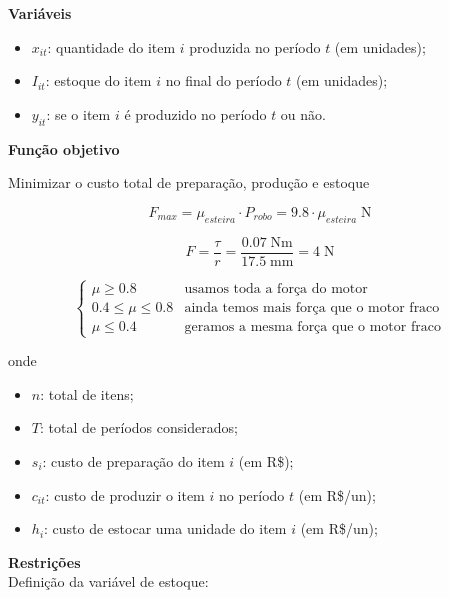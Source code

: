 \documentclass[12pt]{scrartcl}
\newcommand{\un}[1]{\;\textrm{#1}}
\begin{document}
\Large

\textbf{Variáveis}

\begin{itemize}
    \item $x_{it}$: quantidade do item $i$ produzida no período $t$ (em unidades);
    \item $I_{it}$: estoque do item $i$ no final do período $t$ (em unidades);
    \item $y_{it}$: se o item $i$ é produzido no período $t$ ou não.
  \end{itemize}

\textbf{Função objetivo}

Minimizar o custo total de preparação, produção e estoque

\LARGE

\[ F_{max} = \mu_{esteira} \cdot P_{robo} = 9.8 \cdot \mu_{esteira} \un{N}  \]

\[ F = \frac{\tau}{r} = \frac{0.07 \un{Nm}}{17.5 \un{mm}} = 4 \un{N} \]


\Large

\begin{equation}
    \begin{cases}
      \mu \geq 0.8 & \text{usamos toda a força do motor}\\
      0.4 \leq \mu \leq 0.8 & \text{ainda temos mais força que o motor fraco}\\
      \mu \leq 0.4 & \text{geramos a mesma força que o motor fraco}
    \end{cases}       
\end{equation}



onde

\begin{itemize}
    \item $n$: total de itens;
    \item $T$: total de períodos considerados;
    \item $s_{i}$: custo de preparação do item $i$ (em R\$);
    \item $c_{it}$: custo de produzir o item $i$ no período $t$ (em R\$/un);
    \item $h_{i}$: custo de estocar uma unidade do item $i$ (em R\$/un);
  \end{itemize}

  \newpage

\textbf{Restrições} \\ 

Definição da variável de estoque:
\end{document}
